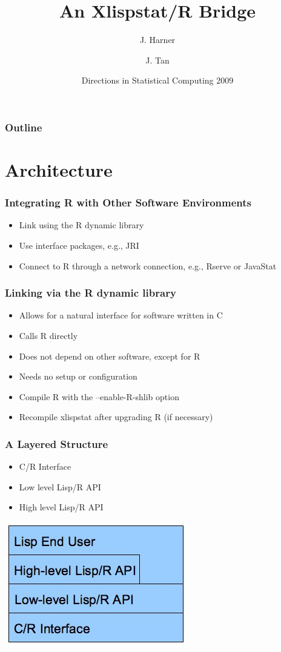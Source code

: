 \documentclass{beamer}
\title[xstatR]{An Xlispstat/R Bridge}
\author{J. Harner \and J. Tan}
\institute[West Virginia University]{
  Department of Statistics\\
  West Virginia University
}
\date[DSC2009]{Directions in Statistical Computing 2009}
\begin{document}
\begin{frame}
  \titlepage
\end{frame}

\begin{frame}
  \frametitle{Outline}
  \tableofcontents
\end{frame}

\section{Architecture}
\begin{frame}
\frametitle{Integrating R with Other Software Environments}
\begin{itemize}
	\item Link using the R dynamic library
	\item Use interface packages, e.g., JRI
	\item Connect to R through a network connection, e.g., Rserve or JavaStat
\end{itemize}
\end{frame}

\begin{frame}
\frametitle{Linking via the R dynamic library}
\begin{itemize}
	\item Allows for a natural interface for software written in C
	\item Calls R directly
	\item Does not depend on other software, except for R
	\item Needs no setup or configuration
	\item Compile R with the --enable-R-shlib option
	\item Recompile xlispstat after upgrading R (if necessary)
\end{itemize}
\end{frame}

\begin{frame}
\frametitle{A Layered Structure}
\begin{itemize}
	\item C/R Interface
	\item Low level Lisp/R API
	\item High level Lisp/R API
\end{itemize}
\includegraphics{layers.jpg}
\end{frame}
\end{document}
